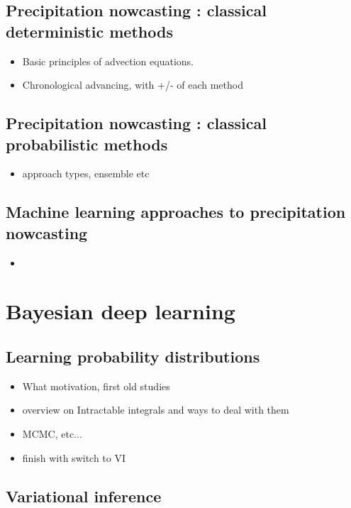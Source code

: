 \subsection{Precipitation nowcasting : classical deterministic methods}
\begin{itemize}
	\item Basic principles of advection equations. 
	\item Chronological advancing, with +/- of each method
\end{itemize}

\subsection{Precipitation nowcasting : classical probabilistic methods}
\begin{itemize}
	\item approach types, ensemble etc
\end{itemize}

\subsection{Machine learning approaches to precipitation nowcasting}
\begin{itemize}
	\item 
\end{itemize}

\section{Bayesian deep learning}

\subsection{Learning probability distributions}

\begin{itemize}
	\item What motivation, first old studies
	\item overview on Intractable integrals and ways to deal with them
	\item MCMC, etc...
	\item finish with switch to VI
\end{itemize}

\subsection{Variational inference}

